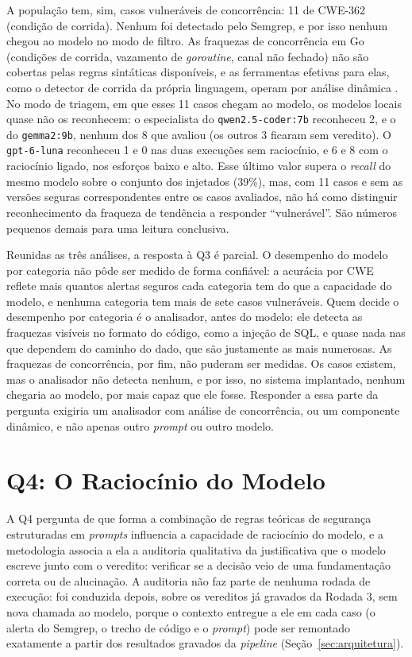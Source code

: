 A população tem, sim, casos vulneráveis de concorrência: 11 de CWE-362 (condição de corrida). Nenhum foi detectado pelo Semgrep, e por isso nenhum chegou ao modelo no modo de filtro. As fraquezas de concorrência em Go (condições de corrida, vazamento de \textit{goroutine}, canal não fechado) não são cobertas pelas regras sintáticas disponíveis, e as ferramentas efetivas para elas, como o detector de corrida da própria linguagem, operam por análise dinâmica \cite{tu2019understanding}. No modo de triagem, em que esses 11 casos chegam ao modelo, os modelos locais quase não os reconhecem: o especialista do \texttt{qwen2.5-coder:7b} reconheceu 2, e o do \texttt{gemma2:9b}, nenhum dos 8 que avaliou (os outros 3 ficaram sem veredito). O \texttt{gpt-6-luna} reconheceu 1 e 0 nas duas execuções sem raciocínio, e 6 e 8 com o raciocínio ligado, nos esforços baixo e alto. Esse último valor supera o \textit{recall} do mesmo modelo sobre o conjunto dos injetados (39\%), mas, com 11 casos e sem as versões seguras correspondentes entre os casos avaliados, não há como distinguir reconhecimento da fraqueza de tendência a responder ``vulnerável''. São números pequenos demais para uma leitura conclusiva.

Reunidas as três análises, a resposta à Q3 é parcial. O desempenho do modelo por categoria não pôde ser medido de forma confiável: a acurácia por CWE reflete mais quantos alertas seguros cada categoria tem do que a capacidade do modelo, e nenhuma categoria tem mais de sete casos vulneráveis. Quem decide o desempenho por categoria é o analisador, antes do modelo: ele detecta as fraquezas visíveis no formato do código, como a injeção de SQL, e quase nada nas que dependem do caminho do dado, que são justamente as mais numerosas. As fraquezas de concorrência, por fim, não puderam ser medidas. Os casos existem, mas o analisador não detecta nenhum, e por isso, no sistema implantado, nenhum chegaria ao modelo, por mais capaz que ele fosse. Responder a essa parte da pergunta exigiria um analisador com análise de concorrência, ou um componente dinâmico, e não apenas outro \textit{prompt} ou outro modelo.

\section{Q4: O Raciocínio do Modelo}
\label{sec:q4}

A Q4 pergunta de que forma a combinação de regras teóricas de segurança estruturadas em \textit{prompts} influencia a capacidade de raciocínio do modelo, e a metodologia associa a ela a auditoria qualitativa da justificativa que o modelo escreve junto com o veredito: verificar se a decisão veio de uma fundamentação correta ou de alucinação. A auditoria não faz parte de nenhuma rodada de execução: foi conduzida depois, sobre os vereditos já gravados da Rodada 3, sem nova chamada ao modelo, porque o contexto entregue a ele em cada caso (o alerta do Semgrep, o trecho de código e o \textit{prompt}) pode ser remontado exatamente a partir dos resultados gravados da \textit{pipeline} (Seção~\ref{sec:arquitetura}).

